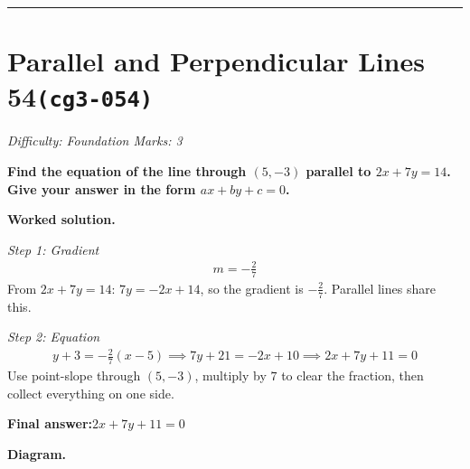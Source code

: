 \documentclass[11pt]{article}
\newcommand{\question}[1]{\par\medskip\noindent\textbf{#1}\par}
\begin{document}
\medskip\hrule

\section*{Parallel and Perpendicular Lines 54\quad\small\texttt{(cg3-054)}}
\textit{Difficulty: Foundation \quad\textbar\quad Marks: 3}

\question{Find the equation of the line through \( (5, -3) \) parallel to \( 2x + 7y = 14 \). Give your answer in the form \( ax + by + c = 0 \).}

\textbf{Worked solution.}

\textit{Step 1: Gradient}
\[\begin{gathered}
m = -\frac{2}{7}
\end{gathered}\]
From \( 2x + 7y = 14 \): \( 7y = -2x + 14 \), so the gradient is \( -\tfrac{2}{7} \). Parallel lines share this.

\textit{Step 2: Equation}
\[\begin{gathered}
y + 3 = -\frac{2}{7}(x - 5) \implies 7y + 21 = -2x + 10 \implies 2x + 7y + 11 = 0
\end{gathered}\]
Use point-slope through \( (5, -3) \), multiply by \( 7 \) to clear the fraction, then collect everything on one side.

\begin{answerbox}
\textbf{Final answer:}\quad \(\displaystyle 2x + 7y + 11 = 0\)
\end{answerbox}
\textbf{Diagram.}
\end{document}
